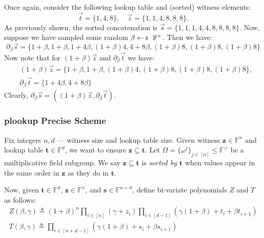 \documentclass[../../book]{subfiles}
\begin{document}
\begin{example}
    Once again, consider the following lookup table and (sorted) witness elements:
    \begin{equation*}
        \vec{t} = \{1,4,8\}, \quad \vec{z} = \{1,1,4,8,8,8\}.
    \end{equation*}
    As previously shown, the sorted concatenation is $\vec{s}=\{1,1,1,4,4,8,8,8,8\}$. Now, suppose 
    we have sampled some random $\beta \leftarrowS \mathbb{F}^{\times}$. Then we have:
    \begin{equation*}
        \partial_{\beta}\vec{s} = \{1+\beta,1+\beta,1+4\beta,(1+\beta)4,4+8\beta,(1+\beta)8,(1+\beta)8,(1+\beta)8\}
    \end{equation*}
    Now note that for $(1+\beta)\vec{z}$ and $\partial_{\beta}\vec{t}$ we have:
    \begin{align*}
        &(1+\beta)\vec{z} = \{1+\beta,1+\beta,(1+\beta)4,(1+\beta)8,(1+\beta)8,(1+\beta)8\}, \\
        &\partial_{\beta}\vec{t} = \{1+4\beta,4+8\beta\}
    \end{align*}
    Clearly, $\partial_{\beta}\vec{s} = ((1+\beta)\vec{z},\partial_{\beta}\vec{t})$.
\end{example}

\subsubsection{plookup Precise Scheme}

Fix integers $n,d$ --- witness size and lookup table size. Given witness
$\boldsymbol{z} \in \mathbb{F}^n$ and lookup table $\boldsymbol{t} \in
\mathbb{F}^d$, we want to ensure $\boldsymbol{z} \subseteq \boldsymbol{t}$. Let
$\Omega = \{\omega^j\}_{j \in [n]} \leq \mathbb{F}^{\times}$ be a multiplicative
field subgroup. We say $\boldsymbol{z} \subseteq \boldsymbol{t}$ is
\textit{sorted by $\boldsymbol{t}$} when values appear in the same order in
$\boldsymbol{z}$ as they do in $\boldsymbol{t}$. 

Now, given $\boldsymbol{t} \in \mathbb{F}^d$, $\boldsymbol{z} \in \mathbb{F}^n$,
and $\boldsymbol{s} \in \mathbb{F}^{n+d}$, define bi-variate polynomials $Z$ and
$T$ as follows:
\begin{gather*}
    Z(\beta,\gamma) \triangleq (1+\beta)^n \prod_{i \in [n]}(\gamma+z_i)\prod_{i \in [d-1]}(\gamma(1+\beta)+t_i+\beta t_{i+1}) \\
    T(\beta,\gamma) \triangleq \prod_{i \in [n+d-1]} (\gamma(1+\beta)+s_i+\beta s_{i+1})
\end{gather*}
\end{document}
